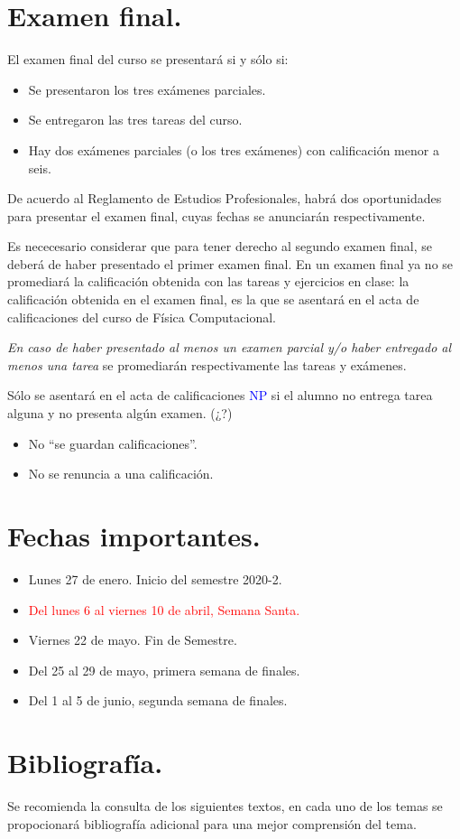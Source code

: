 \documentclass[12pt]{article}
\begin{document}
\section{Examen final.}
El examen final del curso se presentará si y sólo si:
\begin{itemize}
\item Se presentaron los tres exámenes parciales.
\item Se entregaron las tres tareas del curso.
\item Hay dos exámenes parciales (o los tres exámenes) con calificación menor a seis.
\end{itemize}
De acuerdo al Reglamento de Estudios Profesionales, habrá dos oportunidades para presentar el examen final, cuyas fechas se anunciarán respectivamente.
\par
Es nececesario considerar que para tener derecho al segundo examen final, se deberá de haber presentado el primer examen final. En un examen final ya no se promediará la calificación obtenida con las tareas y ejercicios en clase: la calificación obtenida en el examen final, es la que se asentará en el acta de calificaciones del curso de Física Computacional.
\par
\emph{En caso de haber presentado al menos un examen parcial y/o haber entregado al menos una tarea} se promediarán respectivamente las tareas y exámenes.
\par
Sólo se asentará en el acta de calificaciones \textcolor{blue}{NP} si el alumno no entrega tarea alguna y no presenta algún examen. (¿?)
\begin{itemize}
\item No \enquote{se guardan calificaciones}.
\item No se renuncia a una calificación.
\end{itemize}
\section{Fechas importantes.}
\begin{itemize}
\item Lunes 27 de enero. Inicio del semestre 2020-2.
\item \textcolor{red}{Del lunes 6 al viernes 10 de abril, Semana Santa.}
\item Viernes 22 de mayo. Fin de Semestre.
\item Del 25 al 29 de mayo, primera semana de finales.
\item Del 1 al 5 de junio, segunda semana de finales.
\end{itemize}
\section{Bibliografía.}
Se recomienda la consulta de los siguientes textos, en cada uno de los temas se propocionará bibliografía adicional para una mejor comprensión del tema.
\nocite{*}


\end{document}
